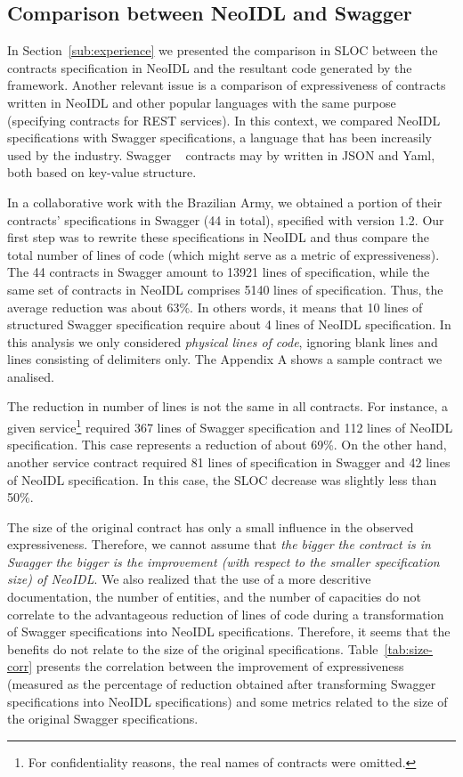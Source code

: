 \documentclass{ws-ijseke}
\newcommand{\neoidl}{NeoIDL}
\begin{document}
\subsection{Comparison between \neoidl{} and Swagger}\label{sub:neoIDLandSwagger}

In Section~\ref{sub:experience} we presented the comparison in SLOC between the contracts
specification in NeoIDL and the resultant code generated by the framework. Another
relevant issue is a comparison of expressiveness of contracts written in \neoidl{} and other popular
languages with the same purpose (specifying contracts for REST services). In this context,
we compared \neoidl{} specifications with Swagger specifications, a language that has been increasily used by the industry.
Swagger ~\cite{swagger} contracts may by written in JSON and Yaml, both based on key-value structure.

In a collaborative work with the Brazilian Army,
we obtained a portion of their contracts' specifications in Swagger (44 in total), specified with version 1.2.
Our first step was to rewrite these specifications in \neoidl{} and thus compare the total
number of lines of code (which might serve as a metric of expressiveness).
The 44 contracts in Swagger amount to 13921 lines of specification, while the same set of contracts in NeoIDL comprises 5140 lines of specification. Thus, the average reduction was about 63\%. In others words, it means that 10 lines of structured Swagger specification require
about 4 lines of \neoidl{} specification. In this analysis we only considered \emph{physical lines of code}, ignoring 
blank lines and lines consisting of delimiters only. The Appendix A shows a sample contract we analised.

The reduction in number of lines is not the same in all contracts. For instance, a given service\footnote{For confidentiality reasons, the real names of contracts were omitted.} required 367 lines of Swagger specification and 112 lines of \neoidl{} specification. This case  
represents a reduction of about 69\%. On the other hand, another service contract required 
81 lines of specification in Swagger and 42 lines of \neoidl{} specification. In this case, the SLOC decrease was slightly less than 50\%.

The size of the original contract has only a small influence in the observed expressiveness. 
Therefore, we cannot assume that \emph{the bigger the contract is in Swagger 
the bigger is the improvement (with respect to the smaller specification size) of \neoidl}. We 
also realized that the use of a more descritive documentation, the number of entities, and the number of capacities do not correlate to the advantageous reduction of lines of code during a 
transformation of Swagger specifications into \neoidl{} specifications. Therefore, it seems that 
the benefits do not relate to the size of the original specifications.  
Table~\ref{tab:size-corr} presents the correlation between the improvement of 
expressiveness (measured as the percentage of reduction obtained 
after transforming Swagger specifications into \neoidl{} specifications) and 
some metrics related to the size of the original Swagger specifications.
\end{document}
